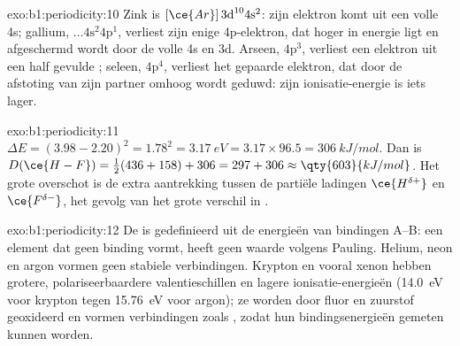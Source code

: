 \begin{solution}{exo:b1:periodicity:10}
Zink is $[\ce{Ar}]\,3\text{d}^{10} 4\text{s}^2$: zijn elektron komt uit
een volle 4s; gallium, $\dots 4\text{s}^2 4\text{p}^1$, verliest zijn
enige 4p-elektron, dat hoger in energie ligt en afgeschermd wordt door de
volle 4s en 3d. Arseen, $4\text{p}^3$, verliest een elektron uit een half
gevulde ; seleen, $4\text{p}^4$, verliest het gepaarde elektron,
dat door de afstoting van zijn partner omhoog wordt geduwd: zijn
ionisatie-energie is iets lager.
\end{solution}

\begin{solution}{exo:b1:periodicity:11}
$\Delta E = (3.98 - 2.20)^2 = 1.78^2 = \qty{3.17}{eV} = 3.17 \times 96.5 =
\qty{306}{kJ/mol}$. Dan is $D(\ce{H-F}) = \tfrac12(436 + 158) + 306 = 297 +
306 \approx \qty{603}{kJ/mol}$. Het grote overschot is de extra
aantrekking tussen de partiële ladingen $\ce{H^{\delta+}}$ en
$\ce{F^{\delta-}}$, het gevolg van het grote verschil in
.
\end{solution}

\begin{solution}{exo:b1:periodicity:12}
De  is gedefinieerd uit de energieën van bindingen
A--B: een element dat geen binding vormt, heeft geen waarde volgens
Pauling. Helium, neon en argon vormen geen stabiele verbindingen.
Krypton en vooral xenon hebben grotere, polariseerbaardere
valentieschillen en lagere ionisatie-energieën (\qty{14.0}{eV} voor
krypton tegen \qty{15.76}{eV} voor argon); ze worden door fluor en
zuurstof geoxideerd en vormen verbindingen zoals , zodat hun
bindingsenergieën gemeten kunnen worden.
\end{solution}

